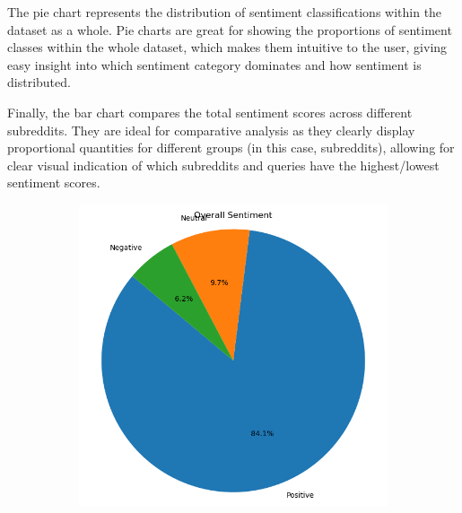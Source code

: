 The pie chart represents the distribution of sentiment classifications within the dataset as a whole. Pie charts are great for showing the proportions of sentiment classes within the whole dataset, which makes them intuitive to the user, giving easy insight into which sentiment category dominates and how sentiment is distributed.

Finally, the bar chart compares the total sentiment scores across different subreddits. They are ideal for comparative analysis as they clearly display proportional quantities for different groups (in this case, subreddits),  allowing for clear visual indication of which subreddits and queries have the highest/lowest sentiment scores.

\begin{figure}[h]
    \centering
    \begin{subfigure}{0.49\textwidth}
        \centering
        \includegraphics[width=\textwidth]{figures/pie-chart.png}
    \end{subfigure}
    \begin{subfigure}{0.49\textwidth}
        \centering

\end{subfigure}
\end{figure}
